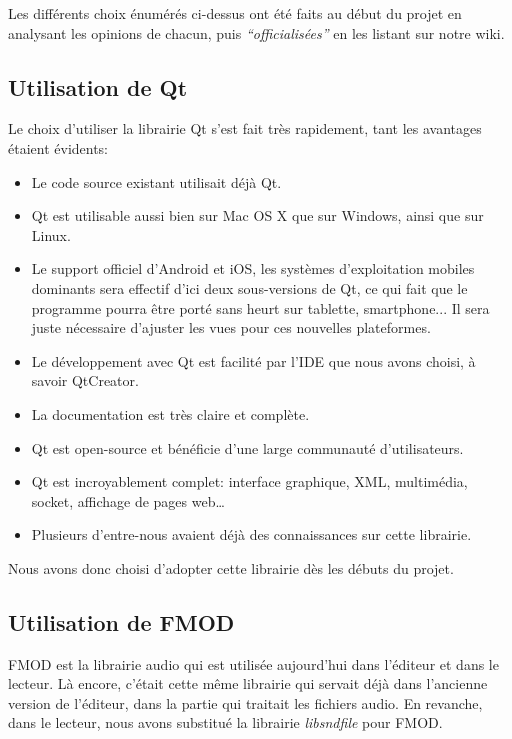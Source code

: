 Les différents choix énumérés ci-dessus ont été faits au début du projet en analysant les opinions de chacun, puis \textit{``officialisées''} en les listant sur notre wiki.


\subsection{Utilisation de Qt}

Le choix d'utiliser la librairie Qt s'est fait très rapidement, tant les avantages étaient évidents:
\begin{itemize}
 \item Le code source existant utilisait déjà Qt.
 \item Qt est utilisable aussi bien sur Mac OS X que sur Windows, ainsi que sur Linux.
 \item Le support officiel d'Android et iOS, les systèmes d'exploitation mobiles dominants sera effectif d'ici deux sous-versions de Qt,
 ce qui fait que le programme pourra être porté sans heurt sur tablette, smartphone... Il sera juste nécessaire d'ajuster les vues pour
 ces nouvelles plateformes.
 \item Le développement avec Qt est facilité par l'IDE que nous avons choisi, à savoir QtCreator.
 \item La documentation est très claire et complète.
 \item Qt est open-source et bénéficie d'une large communauté d'utilisateurs.
 \item Qt est incroyablement complet: interface graphique, XML, multimédia, socket, affichage de pages web\dots
 \item Plusieurs d'entre-nous avaient déjà des connaissances sur cette librairie.
\end{itemize}

Nous avons donc choisi d'adopter cette librairie dès les débuts du projet.

\subsection{Utilisation de FMOD}

FMOD est la librairie audio qui est utilisée aujourd'hui dans l'éditeur et dans le lecteur. Là encore, c'était cette même librairie qui servait déjà dans l'ancienne version de l'éditeur, dans la partie qui traitait les fichiers audio. En revanche, dans le lecteur, nous avons substitué la librairie \textit{libsndfile} pour FMOD.

